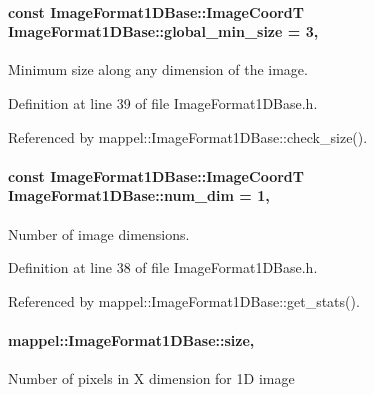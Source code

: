 \paragraph[{\texorpdfstring{global\+\_\+min\+\_\+size}{global_min_size}}]{\setlength{\rightskip}{0pt plus 5cm}const {\bf Image\+Format1\+D\+Base\+::\+Image\+CoordT} Image\+Format1\+D\+Base\+::global\+\_\+min\+\_\+size = 3\hspace{0.3cm}{\ttfamily [static]}, {\ttfamily [inherited]}}\hypertarget{classmappel_1_1ImageFormat1DBase_a27c75df8b3d83856d7c2c42ee987af89}{}\label{classmappel_1_1ImageFormat1DBase_a27c75df8b3d83856d7c2c42ee987af89}
Minimum size along any dimension of the image. 

Definition at line 39 of file Image\+Format1\+D\+Base.\+h.



Referenced by mappel\+::\+Image\+Format1\+D\+Base\+::check\+\_\+size().

\paragraph[{\texorpdfstring{num\+\_\+dim}{num_dim}}]{\setlength{\rightskip}{0pt plus 5cm}const {\bf Image\+Format1\+D\+Base\+::\+Image\+CoordT} Image\+Format1\+D\+Base\+::num\+\_\+dim = 1\hspace{0.3cm}{\ttfamily [static]}, {\ttfamily [inherited]}}\hypertarget{classmappel_1_1ImageFormat1DBase_af81159de9010c3618d2f69349c1f2368}{}\label{classmappel_1_1ImageFormat1DBase_af81159de9010c3618d2f69349c1f2368}
Number of image dimensions. 

Definition at line 38 of file Image\+Format1\+D\+Base.\+h.



Referenced by mappel\+::\+Image\+Format1\+D\+Base\+::get\+\_\+stats().

\paragraph[{\texorpdfstring{size}{size}}]{ mappel\+::\+Image\+Format1\+D\+Base\+::size\hspace{0.3cm}{\ttfamily [protected]}, {\ttfamily [inherited]}}\hypertarget{classmappel_1_1ImageFormat1DBase_a8941b4d028e4dd881146a7c1b9039bb1}{}\label{classmappel_1_1ImageFormat1DBase_a8941b4d028e4dd881146a7c1b9039bb1}
Number of pixels in X dimension for 1D image 

